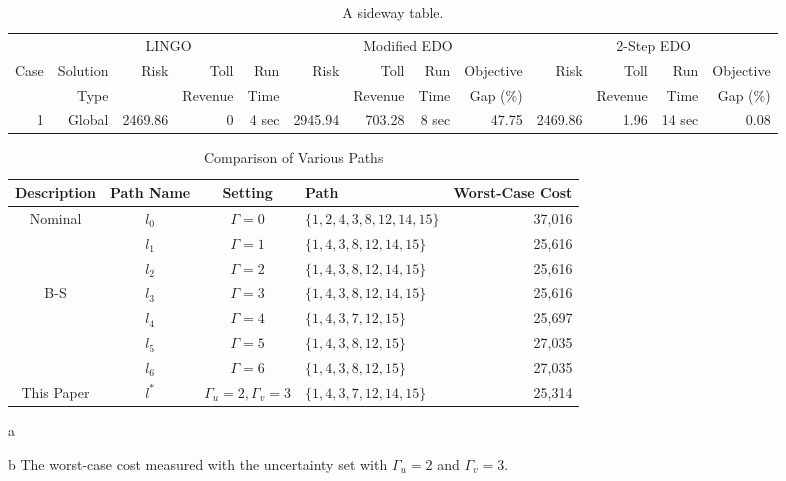 \documentclass[letterpaper, 11pt]{article}
\begin{document}
\begin{sidewaystable}
\caption{A sideway table.}
\label{table:EDOandLINGO}
\begin{tabular}{r rrrr rrrr rrrr}
\toprule
& \multicolumn{4}{c}{LINGO} & \multicolumn{4}{c}{Modified EDO} & \multicolumn{4}{c}{2-Step EDO} \\
\cmidrule(lr){2-5} \cmidrule(lr){6-9} \cmidrule(lr){10-12}
Case &     Solution &    Risk &     Toll &   Run   &    Risk &    Toll &   Run & Objective   &    Risk &    Toll &    Run & Objective \\
     &         Type &         &  Revenue &  Time   &         & Revenue &  Time &  Gap (\%)   &         & Revenue &   Time &  Gap (\%) \\
\midrule
   1 &       Global & 2469.86 &        0 & 4 sec   & 2945.94 &  703.28 & 8 sec &     47.75   & 2469.86 &    1.96 & 14 sec &      0.08 \\
\bottomrule
\end{tabular}
\end{sidewaystable}





\begin{table} \centering
\begin{threeparttable}
\caption{Comparison of Various Paths}
\label{table:threeparttable}
    \begin{tabular}{ccclr}
    \toprule
    Description & Path Name & Setting & Path & Worst-Case Cost \tnote{b} \\
    \midrule
    Nominal
         & $l_0$ & $\Gamma=0$ & $\{1,2,4,3,8,12,14,15\}$ & 37,016 \\
    \midrule
         & $l_1$ & $\Gamma=1$ & $\{1,4,3,8,12,14,15\}$ & 25,616 \\
         & $l_2$ & $\Gamma=2$ & $\{1,4,3,8,12,14,15\}$ & 25,616 \\
    B-S\tnote{a}
         & $l_3$ & $\Gamma=3$ & $\{1,4,3,8,12,14,15\}$ & 25,616 \\
         & $l_4$ & $\Gamma=4$ & $\{1,4,3,7,12,15\}$ & 25,697 \\
         & $l_5$ & $\Gamma=5$ & $\{1,4,3,8,12,15\}$ & 27,035 \\
         & $l_6$ & $\Gamma=6$ & $\{1,4,3,8,12,15\}$ & 27,035 \\
    \midrule
    This Paper
         & $l^*$ & $\Gamma_u=2, \Gamma_v=3$ & $\{1,4,3,7,12,14,15\}$ & 25,314 \\
    \bottomrule
    \end{tabular}
    \begin{tablenotes}
        \item [a] \citet{Bertsimas2003network}
        \item [b] The worst-case cost measured with the uncertainty set with $\Gamma_u=2$ and $\Gamma_v=3$.
    \end{tablenotes}
\end{threeparttable}
\end{table}
\end{document}
